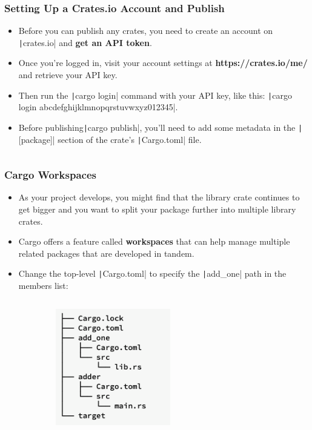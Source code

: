 \documentclass{beamer}
\begin{document}
\begin{frame}[fragile]
	\frametitle{Setting Up a Crates.io Account and Publish}
	\begin{itemize}
		\item Before you can publish any crates, you need to create an account on \texttt|crates.io| and \textbf{get an API token}. 
		\item 	Once you’re logged in, visit your account settings at \textbf{https://crates.io/me/} and retrieve your API key. 
		\item  Then run the \texttt|cargo login| command with your API key, like this: \texttt|cargo login abcdefghijklmnopqrstuvwxyz012345|.
		\item Before publishing\texttt|cargo publish|, you’ll need to add some metadata in the \texttt|[package]| section of the crate’s \texttt|Cargo.toml| file.
		\inputminted[fontsize=\scriptsize]{toml}{./code/cargo3.toml}
	\end{itemize}
	
\end{frame} 

\begin{frame}[fragile]
	\frametitle{Cargo Workspaces}
	 \begin{itemize}
	 	\item As your project develops, you might find that the library crate continues to get bigger and you want to split your package further into multiple library crates.
	 	\item 	 Cargo offers a feature called \textbf{workspaces} that can help manage multiple related packages that are developed in tandem.
	 	\item  Change the top-level \texttt|Cargo.toml| to specify the \texttt|add_one| path in the members list:
	 	
	 	\begin{columns}
	 		\inputminted{toml}{./code/cargo4.toml}
	 		\begin{figure}
	 			\centering
	 			\includegraphics[width=0.5\textwidth]{img/workspace}
	 		\end{figure}
	 	\end{columns}
	 \end{itemize}
\end{frame} 
\end{document}
